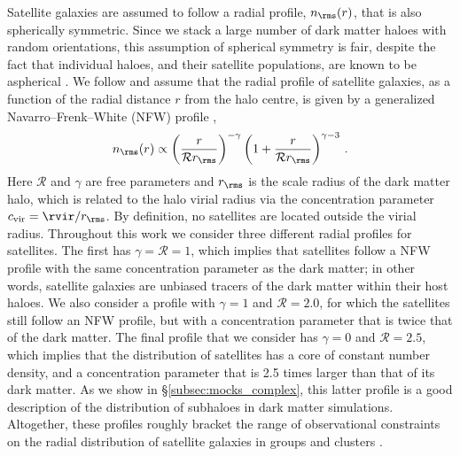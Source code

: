 \documentclass[fleqn,usenatbib,useAMS]{mnras}
\begin{document}
	Satellite galaxies are assumed to follow a radial profile, $n_\rms(r)$, that is also spherically symmetric. Since we stack a large number of dark matter haloes with random orientations, this assumption of spherical symmetry is fair, despite the fact that individual haloes, and their satellite populations, are known to be aspherical \citep[e.g.,][]{Wang+08}. We follow \cite{vdBosch+04} and assume that the radial profile of satellite galaxies, as a function of the radial distance $r$ from the halo centre, is given by a generalized Navarro--Frenk--White (NFW) profile \citep{Navarro+96},
	\begin{equation}\label{nsatprof}
	n_\rms (r) \propto \left( \frac{r}{\mathcal{R} r_\rms} \right)^{-\gamma} \left( 1 + \frac{r}{\mathcal{R} r_\rms} \right)^{\gamma - 3}\,.
	\end{equation}
	Here $\mathcal{R}$ and $\gamma$ are free parameters and $r_\rms$ is the scale radius of the dark matter halo, which is related to the halo virial radius via the concentration parameter $c_{\rm vir} = \rvir / r_\rms$. By definition, no satellites are located outside the virial radius. Throughout this work we consider three different radial profiles for satellites. The first has $\gamma = \mathcal{R} = 1$, which implies that satellites follow a NFW profile with the same concentration parameter as the dark matter; in other words, satellite galaxies are unbiased tracers of the dark matter within their host haloes. We also consider a profile with $\gamma = 1$ and $\mathcal{R} = 2.0$, for which the satellites still follow an NFW profile, but with a concentration parameter that is twice that of the dark matter. The final profile that we consider has $\gamma = 0$ and $\mathcal{R} = 2.5$, which implies that the distribution of satellites has a core of constant number density, and a concentration parameter that is 2.5 times larger than that of its dark matter. As we show in \S\ref{subsec:mocks_complex}, this latter profile is a good description of the distribution of subhaloes in dark matter simulations. Altogether, these profiles roughly bracket the range of observational constraints on the radial distribution of satellite galaxies in groups and clusters \citep[e.g.,][]{Carlberg+97, vdMarel+00, Lin+04, Yang+05, Chen08, More+09b, Guo+12a, Cacciato+13}.
	
\end{document}
